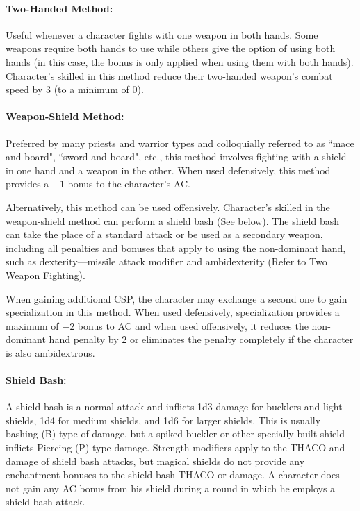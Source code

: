 \begin{multicols}{2}
\paragraph{Two-Handed Method:} Useful whenever a character fights with one weapon in both hands.  Some weapons require both hands to use while others give the option of using both hands (in this case, the bonus is only applied when using them with both hands).  Character's skilled in this method reduce their two-handed weapon's combat speed by 3 (to a minimum of 0).

\paragraph{Weapon-Shield Method:} Preferred by many priests and warrior types and colloquially referred to as ``mace and board", ``sword and board", etc., this method involves fighting with a shield in one hand and a weapon in the other.  When used defensively, this method provides a $-1$ bonus to the character's AC.

Alternatively, this method can be used offensively.  Character's skilled in the weapon-shield method can perform a shield bash (See below).  The shield bash can take the place of a standard attack or be used as a secondary weapon, including all penalties and bonuses that apply to using the non-dominant hand, such as dexterity---missile attack modifier and ambidexterity (Refer to Two Weapon Fighting).  

When gaining additional CSP, the character may exchange a second one to gain specialization in this method.  When used defensively, specialization provides a maximum of $-2$ bonus to AC and when used offensively, it reduces the non-dominant hand penalty by 2 or eliminates the penalty completely if the character is also ambidextrous.

\paragraph{Shield Bash:} A shield bash is a normal attack and inflicts 1d3 damage for bucklers and light shields, 1d4 for medium shields, and 1d6 for larger shields.  This is usually bashing (B) type of damage, but a spiked buckler or other specially built shield inflicts Piercing (P) type damage.  Strength modifiers apply to the THACO and damage of shield bash attacks, but magical shields do not provide any enchantment bonuses to the shield bash THACO or damage.  A character does not gain any AC bonus from his shield during a round in which he employs a shield bash attack.


\end{multicols}
